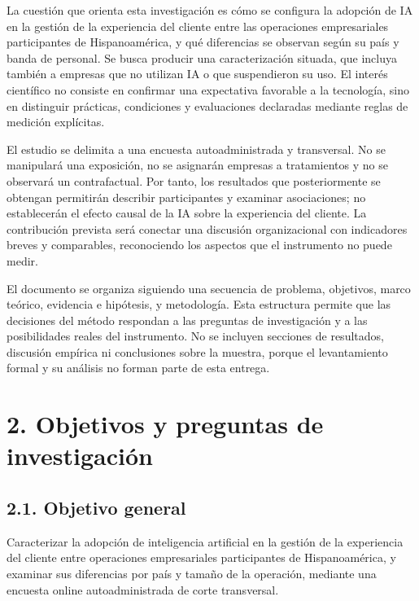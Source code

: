 \documentclass[12pt,letterpaper]{article}
\begin{document}
La cuestión que orienta esta investigación es cómo se configura la adopción de IA en la gestión de la experiencia del cliente entre las operaciones empresariales participantes de Hispanoamérica, y qué diferencias se observan según su país y banda de personal. Se busca producir una caracterización situada, que incluya también a empresas que no utilizan IA o que suspendieron su uso. El interés científico no consiste en confirmar una expectativa favorable a la tecnología, sino en distinguir prácticas, condiciones y evaluaciones declaradas mediante reglas de medición explícitas.

El estudio se delimita a una encuesta autoadministrada y transversal. No se manipulará una exposición, no se asignarán empresas a tratamientos y no se observará un contrafactual. Por tanto, los resultados que posteriormente se obtengan permitirán describir participantes y examinar asociaciones; no establecerán el efecto causal de la IA sobre la experiencia del cliente. La contribución prevista será conectar una discusión organizacional con indicadores breves y comparables, reconociendo los aspectos que el instrumento no puede medir.

El documento se organiza siguiendo una secuencia de problema, objetivos, marco teórico, evidencia e hipótesis, y metodología. Esta estructura permite que las decisiones del método respondan a las preguntas de investigación y a las posibilidades reales del instrumento. No se incluyen secciones de resultados, discusión empírica ni conclusiones sobre la muestra, porque el levantamiento formal y su análisis no forman parte de esta entrega.

\section*{2. Objetivos y preguntas de investigación}
\subsection*{2.1. Objetivo general}
Caracterizar la adopción de inteligencia artificial en la gestión de la experiencia del cliente entre operaciones empresariales participantes de Hispanoamérica, y examinar sus diferencias por país y tamaño de la operación, mediante una encuesta online autoadministrada de corte transversal.
\end{document}
